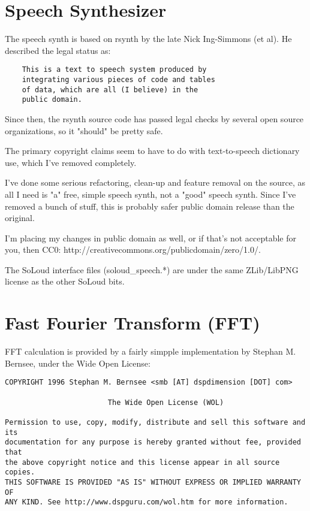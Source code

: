 \section{Speech Synthesizer}
The speech synth is based on rsynth by the late Nick Ing-Simmons (et al). He described the legal status as:

\scriptsize
\begin{verbatim}
    This is a text to speech system produced by
    integrating various pieces of code and tables
    of data, which are all (I believe) in the
    public domain.
\end{verbatim}
\normalsize

Since then, the rsynth source code has passed legal checks by several open source organizations, so it "should" be pretty safe.

The primary copyright claims seem to have to do with text-to-speech dictionary use, which I've removed completely.

I've done some serious refactoring, clean-up and feature removal on the source, as all I need is "a" free, simple speech synth, not a "good" speech synth. Since I've removed a bunch of stuff, this is probably safer public domain release than the original.

I'm placing my changes in public domain as well, or if that's not acceptable for you, then CC0: http://creativecommons.org/publicdomain/zero/1.0/.

The SoLoud interface files (soloud\_speech.*) are under the same ZLib/LibPNG license as the other SoLoud bits.

\section{Fast Fourier Transform (FFT)}

FFT calculation is provided by a fairly simpple implementation by Stephan M. Bernsee, under the Wide Open License:

\scriptsize
\begin{verbatim}
COPYRIGHT 1996 Stephan M. Bernsee <smb [AT] dspdimension [DOT] com>

						The Wide Open License (WOL)

Permission to use, copy, modify, distribute and sell this software and its
documentation for any purpose is hereby granted without fee, provided that
the above copyright notice and this license appear in all source copies. 
THIS SOFTWARE IS PROVIDED "AS IS" WITHOUT EXPRESS OR IMPLIED WARRANTY OF
ANY KIND. See http://www.dspguru.com/wol.htm for more information.
\end{verbatim}
\normalsize

